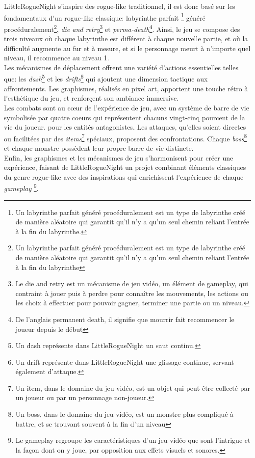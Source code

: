 \documentclass[10pt]{article}
\begin{document}
LittleRogueNight s'inspire des rogue-like traditionnel, il est donc basé sur les fondamentaux d'un rogue-like classique: labyrinthe parfait
\footnote{Un labyrinthe parfait généré procéduralement est un type de labyrinthe créé de manière aléatoire qui garantit qu'il n'y a qu'un 
seul chemin reliant l'entrée à la fin du labyrinthe.} généré procéduralement\footnote{Un labyrinthe parfait généré procéduralement est un type de labyrinthe 
créé de manière aléatoire qui garantit qu'il n'y a qu'un seul chemin reliant l'entrée à la fin du labyrinthe}, \textit{die and retry}\footnote{Le die and retry est un mécanisme de jeu vidéo, un élément de gameplay, 
qui contraint à jouer puis à perdre pour connaître les mouvements, les actions ou les choix à effectuer pour pouvoir gagner, terminer une partie ou 
un niveau.} et \textit{perma-death}\footnote{De l'anglais permanent death, il signifie que mourrir fait recommencer le joueur depuis le début}. 
Ainsi, le jeu se compose des trois niveaux où chaque labyrinthe est différent à chaque nouvelle partie, 
et où la difficulté augmente au fur et à mesure, et si le personnage meurt à n'importe quel niveau, il recommence au niveau 1.\\

Les mécanismes de déplacement offrent une variété d'actions essentielles telles que: les \textit{dash}\footnote{Un dash représente dans LittleRogueNight un saut continu.} et 
les \textit{drifts}\footnote{Un drift représente dans LittleRogueNight une glissage continue, servant également d'attaque.} qui
ajoutent une dimension tactique aux affrontements. Les graphismes, réalisés en pixel art, apportent une touche rétro à l'esthétique du jeu, 
et renforçent son ambiance immersive.\\

Les combats sont au cœur de l'expérience de jeu, avec un système de barre de vie symbolisée par quatre coeurs qui représentent chacuns vingt-cinq pourcent 
de la vie du joueur. pour les entités antagonistes. Les attaques, 
qu'elles soient directes ou facilitées par des \textit{items}\footnote{Un item, dans le domaine du jeu vidéo, est un objet qui peut être 
collecté par un joueur ou par un personnage non-joueur.} 
spéciaux, proposent des confrontations. Chaque \textit{boss}\footnote{Un boss, dans le domaine du jeu vidéo, est un monstre plus compliqué à battre, 
et se trouvant souvent à la fin d'un niveau} et chaque monstre 
possèdent leur propre barre de vie distincte.\\

Enfin, les graphismes et les mécanismes de jeu s'harmonisent pour créer une expérience, faisant de LittleRogueNight un projet 
combinant éléments classiques du genre rogue-like avec des inspirations qui enrichissent l'expérience de chaque \textit{gameplay}
\footnote{Le gameplay regroupe les caractéristiques d'un jeu vidéo que sont l'intrigue et la façon dont on y joue, par opposition aux effets visuels et sonores. }.\\
\end{document}
